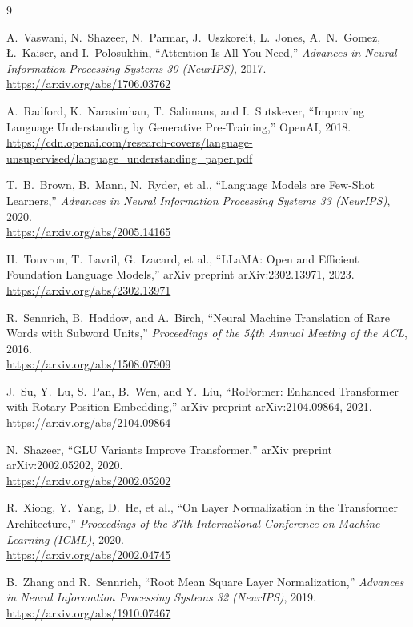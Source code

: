\documentclass[11pt,a4paper]{article}
\begin{document}
\newpage
\begin{thebibliography}{9}

  A.~Vaswani, N.~Shazeer, N.~Parmar, J.~Uszkoreit, L.~Jones, A.~N.~Gomez,
  \L.~Kaiser, and I.~Polosukhin,
  ``Attention Is All You Need,''
  \emph{Advances in Neural Information Processing Systems 30 (NeurIPS)}, 2017.
  \\\url{https://arxiv.org/abs/1706.03762}

  A.~Radford, K.~Narasimhan, T.~Salimans, and I.~Sutskever,
  ``Improving Language Understanding by Generative Pre-Training,''
  OpenAI, 2018.
  \\\url{https://cdn.openai.com/research-covers/language-unsupervised/language_understanding_paper.pdf}

  T.~B.~Brown, B.~Mann, N.~Ryder, et al.,
  ``Language Models are Few-Shot Learners,''
  \emph{Advances in Neural Information Processing Systems 33 (NeurIPS)}, 2020.
  \\\url{https://arxiv.org/abs/2005.14165}

  H.~Touvron, T.~Lavril, G.~Izacard, et al.,
  ``LLaMA: Open and Efficient Foundation Language Models,''
  arXiv preprint arXiv:2302.13971, 2023.
  \\\url{https://arxiv.org/abs/2302.13971}

  R.~Sennrich, B.~Haddow, and A.~Birch,
  ``Neural Machine Translation of Rare Words with Subword Units,''
  \emph{Proceedings of the 54th Annual Meeting of the ACL}, 2016.
  \\\url{https://arxiv.org/abs/1508.07909}

  J.~Su, Y.~Lu, S.~Pan, B.~Wen, and Y.~Liu,
  ``RoFormer: Enhanced Transformer with Rotary Position Embedding,''
  arXiv preprint arXiv:2104.09864, 2021.
  \\\url{https://arxiv.org/abs/2104.09864}

  N.~Shazeer,
  ``GLU Variants Improve Transformer,''
  arXiv preprint arXiv:2002.05202, 2020.
  \\\url{https://arxiv.org/abs/2002.05202}

  R.~Xiong, Y.~Yang, D.~He, et al.,
  ``On Layer Normalization in the Transformer Architecture,''
  \emph{Proceedings of the 37th International Conference on Machine Learning (ICML)}, 2020.
  \\\url{https://arxiv.org/abs/2002.04745}

  B.~Zhang and R.~Sennrich,
  ``Root Mean Square Layer Normalization,''
  \emph{Advances in Neural Information Processing Systems 32 (NeurIPS)}, 2019.
  \\\url{https://arxiv.org/abs/1910.07467}

\end{thebibliography}
\end{document}
